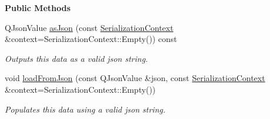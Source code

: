 \begin{Indent}\textbf{ Public Methods}\par
\begin{DoxyCompactItemize}
\item 
\mbox{\label{structrev_1_1_audio_source_settings_a2741a75ff3cbaa0298bdd7665a8a12f6}} 
Q\+Json\+Value \mbox{\hyperlink{structrev_1_1_audio_source_settings_a2741a75ff3cbaa0298bdd7665a8a12f6}{as\+Json}} (const \mbox{\hyperlink{structrev_1_1_serialization_context}{Serialization\+Context}} \&context=Serialization\+Context\+::\+Empty()) const
\begin{DoxyCompactList}\small\item\em Outputs this data as a valid json string. \end{DoxyCompactList}\item 
\mbox{\label{structrev_1_1_audio_source_settings_a206f5f0936d0210fe6a1807b5ebca885}} 
void \mbox{\hyperlink{structrev_1_1_audio_source_settings_a206f5f0936d0210fe6a1807b5ebca885}{load\+From\+Json}} (const Q\+Json\+Value \&json, const \mbox{\hyperlink{structrev_1_1_serialization_context}{Serialization\+Context}} \&context=Serialization\+Context\+::\+Empty())
\begin{DoxyCompactList}\small\item\em Populates this data using a valid json string. \end{DoxyCompactList}\end{DoxyCompactItemize}
\end{Indent}
